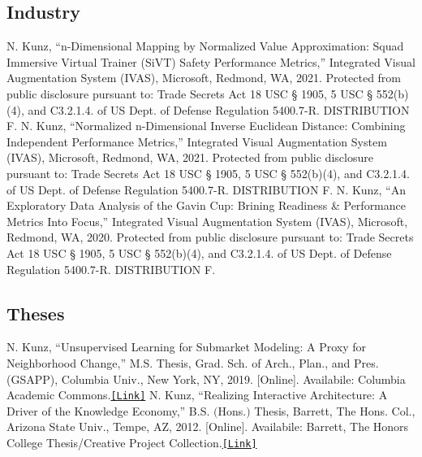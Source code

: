 \documentclass{article}
\begin{document}
    \subsection*{Industry}
        N. Kunz, ``n-Dimensional Mapping by Normalized Value Approximation: Squad Immersive Virtual Trainer (SiVT) Safety Performance Metrics,'' Integrated Visual Augmentation System (IVAS), Microsoft, Redmond, WA, 2021. Protected from public disclosure pursuant to: Trade Secrets Act 18 USC § 1905, 5 USC § 552(b)(4), and C3.2.1.4. of US Dept. of Defense Regulation 5400.7-R. DISTRIBUTION F.\newline\newline
        N. Kunz, ``Normalized n-Dimensional Inverse Euclidean Distance: Combining Independent Performance Metrics,'' Integrated Visual Augmentation System (IVAS), Microsoft, Redmond, WA, 2021. Protected from public disclosure pursuant to: Trade Secrets Act 18 USC § 1905, 5 USC § 552(b)(4), and C3.2.1.4. of US Dept. of Defense Regulation 5400.7-R. DISTRIBUTION F.\newline\newline
        N. Kunz, ``An Exploratory Data Analysis of the Gavin Cup: Brining Readiness \& Performance Metrics Into Focus,'' Integrated Visual Augmentation System (IVAS), Microsoft, Redmond, WA, 2020. Protected from public disclosure pursuant to: Trade Secrets Act 18 USC § 1905, 5 USC § 552(b)(4), and C3.2.1.4. of US Dept. of Defense Regulation 5400.7-R. DISTRIBUTION F.
    \subsection*{Theses}
        N. Kunz, ``Unsupervised Learning for Submarket Modeling: A Proxy for Neighborhood Change,'' M.S. Thesis, Grad. Sch. of Arch., Plan., and Pres. (GSAPP), Columbia Univ., New York, NY, 2019. [Online]. Availabile: Columbia Academic Commons.\space\href{https://doi.org/10.7916/d8-rj87-yx32}{\texttt{[Link]}}\newline\newline
        N. Kunz, ``Realizing Interactive Architecture: A Driver of the Knowledge Economy,'' B.S. $($Hons.$)$ Thesis, Barrett, The Hons. Col., Arizona State Univ., Tempe, AZ, 2012. [Online]. Availabile: Barrett, The Honors College Thesis/Creative Project Collection.\space\href{https://repository.asu.edu/collections/130}{\texttt{[Link]}}
\newpage
\end{document}
